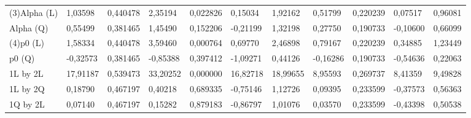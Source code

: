 \begin{table}[H]
{\begin{tabular}{lllllllllll}
\rowcolor[HTML]{FFFFFF} 
(3)Alpha   (L) & {\color[HTML]{FF0000} 1,03598}  & {\color[HTML]{FF0000} 0,440478} & {\color[HTML]{FF0000} 2,35194}  & {\color[HTML]{FF0000} 0,022826} & {\color[HTML]{FF0000} 0,15034}  & {\color[HTML]{FF0000} 1,92162}  & {\color[HTML]{FF0000} 0,51799}  & {\color[HTML]{FF0000} 0,220239} & {\color[HTML]{FF0000} 0,07517}  & {\color[HTML]{FF0000} 0,96081}  \\
\rowcolor[HTML]{FFFFFF} 
Alpha   (Q)    & {\color[HTML]{181A1B} 0,55499}  & {\color[HTML]{181A1B} 0,381465} & {\color[HTML]{181A1B} 1,45490}  & {\color[HTML]{181A1B} 0,152206} & {\color[HTML]{181A1B} -0,21199} & {\color[HTML]{181A1B} 1,32198}  & {\color[HTML]{181A1B} 0,27750}  & {\color[HTML]{181A1B} 0,190733} & {\color[HTML]{181A1B} -0,10600} & {\color[HTML]{181A1B} 0,66099}  \\
\rowcolor[HTML]{FFFFFF} 
(4)p0      (L) & {\color[HTML]{FF0000} 1,58334}  & {\color[HTML]{FF0000} 0,440478} & {\color[HTML]{FF0000} 3,59460}  & {\color[HTML]{FF0000} 0,000764} & {\color[HTML]{FF0000} 0,69770}  & {\color[HTML]{FF0000} 2,46898}  & {\color[HTML]{FF0000} 0,79167}  & {\color[HTML]{FF0000} 0,220239} & {\color[HTML]{FF0000} 0,34885}  & {\color[HTML]{FF0000} 1,23449}  \\
\rowcolor[HTML]{FFFFFF} 
p0      (Q)    & {\color[HTML]{181A1B} -0,32573} & {\color[HTML]{181A1B} 0,381465} & {\color[HTML]{181A1B} -0,85388} & {\color[HTML]{181A1B} 0,397412} & {\color[HTML]{181A1B} -1,09271} & {\color[HTML]{181A1B} 0,44126}  & {\color[HTML]{181A1B} -0,16286} & {\color[HTML]{181A1B} 0,190733} & {\color[HTML]{181A1B} -0,54636} & {\color[HTML]{181A1B} 0,22063}  \\
\rowcolor[HTML]{FFFFFF} 
1L by 2L       & {\color[HTML]{FF0000} 17,91187} & {\color[HTML]{FF0000} 0,539473} & {\color[HTML]{FF0000} 33,20252} & {\color[HTML]{FF0000} 0,000000} & {\color[HTML]{FF0000} 16,82718} & {\color[HTML]{FF0000} 18,99655} & {\color[HTML]{FF0000} 8,95593}  & {\color[HTML]{FF0000} 0,269737} & {\color[HTML]{FF0000} 8,41359}  & {\color[HTML]{FF0000} 9,49828}  \\
\rowcolor[HTML]{FFFFFF} 
1L by 2Q       & {\color[HTML]{181A1B} 0,18790}  & {\color[HTML]{181A1B} 0,467197} & {\color[HTML]{181A1B} 0,40218}  & {\color[HTML]{181A1B} 0,689335} & {\color[HTML]{181A1B} -0,75146} & {\color[HTML]{181A1B} 1,12726}  & {\color[HTML]{181A1B} 0,09395}  & {\color[HTML]{181A1B} 0,233599} & {\color[HTML]{181A1B} -0,37573} & {\color[HTML]{181A1B} 0,56363}  \\
\rowcolor[HTML]{FFFFFF} 
1Q by 2L       & {\color[HTML]{181A1B} 0,07140}  & {\color[HTML]{181A1B} 0,467197} & {\color[HTML]{181A1B} 0,15282}  & {\color[HTML]{181A1B} 0,879183} & {\color[HTML]{181A1B} -0,86797} & {\color[HTML]{181A1B} 1,01076}  & {\color[HTML]{181A1B} 0,03570}  & {\color[HTML]{181A1B} 0,233599} & {\color[HTML]{181A1B} -0,43398} & {\color[HTML]{181A1B} 0,50538}  \\

\end{tabular}}
\end{table}
